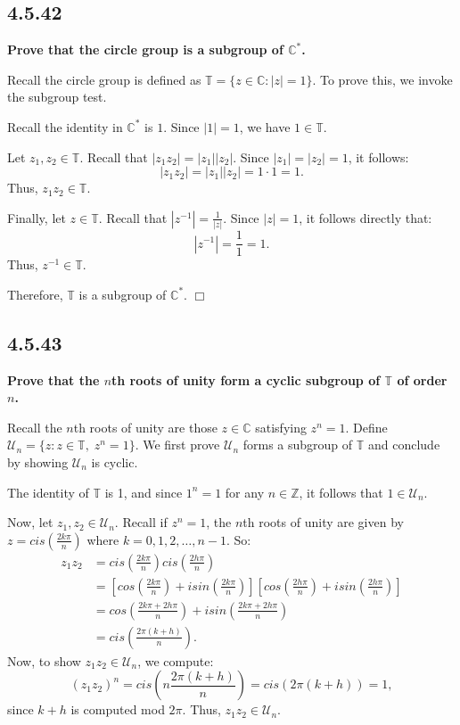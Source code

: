 \documentclass[11pt, a4paper]{article}
\begin{document}
\subsection{4.5.42}
\textbf{Prove that the circle group is a subgroup of $\mathbb{C}^{*}$.}

Recall the circle group is defined as $\mathbb{T} = \{z \in \mathbb{C} : |z| = 1\}$. To prove this, we invoke the subgroup test.

Recall the identity in $\mathbb{C}^{*}$ is $1$. Since $|1| = 1$, we have $1 \in \mathbb{T}$.

Let $z_1, z_2 \in \mathbb{T}$. Recall that $|z_1 z_2| = |z_1| |z_2|$. Since $|z_1| = |z_2| = 1$, it follows:
\[
  |z_1 z_2| = |z_1| |z_2| = 1 \cdot 1 = 1.
\]
Thus, $z_1 z_2 \in \mathbb{T}$. 

Finally, let $z \in \mathbb{T}$. Recall that $|z^{-1}| = \frac{1}{|z|}$. Since $|z| = 1$, it follows directly that:
\[
  |z^{-1}| = \frac{1}{1} = 1.
\]
Thus, $z^{-1} \in \mathbb{T}$.

Therefore, $\mathbb{T}$ is a subgroup of $\mathbb{C}^{*}$. $\Box$

\newpage 

\subsection{4.5.43}
\textbf{Prove that the $n$th roots of unity form a cyclic subgroup of $\mathbb{T}$ of order $n$.}

Recall the $n$th roots of unity are those $z \in \mathbb{C}$ satisfying $z^n = 1$. Define $\mathcal{U}_{n} = \{z : z \in \mathbb{T}, \; z^n = 1\}$. We first prove $\mathcal{U}_{n}$ forms a subgroup of $\mathbb{T}$ and conclude by showing $\mathcal{U}_{n}$ is cyclic.

The identity of $\mathbb{T}$ is 1, and since $1^n = 1$ for any $n \in \mathbb{Z}$, it follows that $1 \in \mathcal{U}_{n}$.

Now, let $z_1, z_2 \in \mathcal{U}_{n}$. Recall if $z^n = 1$, the $n$th roots of unity are given by $z = cis \left ( \frac{2k\pi}{n} \right )$ where $k = 0, 1, 2, \dots, n - 1$. So:
\begin{align*}
  z_1 z_2 &= cis \left ( \frac{2k\pi}{n} \right ) cis \left ( \frac{2h\pi}{n} \right ) \\
          &= \left [cos \left ( \frac{2k\pi}{n}\right ) + isin \left ( \frac{2k\pi}{n} \right ) \right ] \left [cos \left ( \frac{2h\pi}{n}\right ) + isin \left ( \frac{2h\pi}{n} \right ) \right ] \\
          &= cos \left ( \frac{2k\pi + 2h\pi}{n} \right ) + isin \left ( \frac{2k\pi + 2h\pi}{n} \right ) \\
          &= cis \left ( \frac{2\pi(k + h)}{n} \right ).
\end{align*}
Now, to show $z_1 z_2 \in \mathcal{U}_{n}$, we compute:
\[
  (z_1 z_2)^n = cis \left (n \frac{2\pi(k + h)}{n} \right ) = cis (2\pi(k + h)) = 1,
\]
since $k + h$ is computed mod $2\pi$. Thus, $z_1 z_2 \in \mathcal{U}_{n}$.
\end{document}
